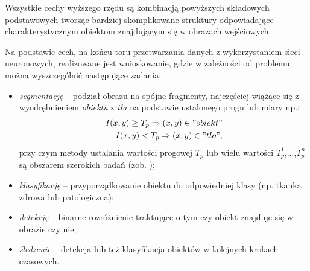 Wszystkie cechy wyższego rzędu są kombinacją powyższych składowych podstawowych tworząc bardziej skomplikowane struktury odpowiadające charakterystycznym obiektom znajdującym się w obrazach wejściowych. 

Na podstawie cech, na końcu toru przetwarzania danych z wykorzystaniem sieci neuronowych, realizowane jest wnioskowanie, gdzie w zależności od problemu można wyszczególnić następujące zadania:
\begin{itemize}
	\item \textit{segmentację} -- podział obrazu na spójne fragmenty, najczęściej wiążące się z wyodrębnieniem \textit{obiektu} z \textit{tła} na podstawie ustalonego progu lub miary np.:
	\begin{equation*}
	\begin{aligned}
	I(x,y) \geq T_p \Rightarrow (x,y) \in "obiekt" \\
	I(x,y) < T_p \Rightarrow (x,y) \in "tlo",
	\end{aligned}
	\end{equation*} 
	przy czym metody ustalania wartości progowej $T_p$ lub wielu wartości {$T_p^1$,...,$T_p^n$} są obszarem szerokich badań (zob. \cite{DBLP:journals/corr/abs-1005-4020});
	\item \textit{klasyfikację} -- przyporządkowanie obiektu do odpowiedniej klasy (np. tkanka zdrowa lub patologiczna);
	\item \textit{detekcję} -- binarne rozróżnienie traktujące o tym czy obiekt znajduje się w obrazie czy nie;
	\item \textit{śledzenie} -- detekcja lub też klasyfikacja obiektów w kolejnych krokach czasowych.
\end{itemize} 

